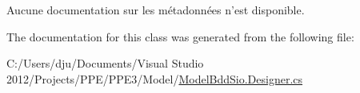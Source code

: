 Aucune documentation sur les métadonnées n'est disponible. 



The documentation for this class was generated from the following file\-:\begin{DoxyCompactItemize}
\item 
C\-:/\-Users/dju/\-Documents/\-Visual Studio 2012/\-Projects/\-P\-P\-E/\-P\-P\-E3/\-Model/\hyperlink{_model_bdd_sio_8_designer_8cs}{Model\-Bdd\-Sio.\-Designer.\-cs}\end{DoxyCompactItemize}
